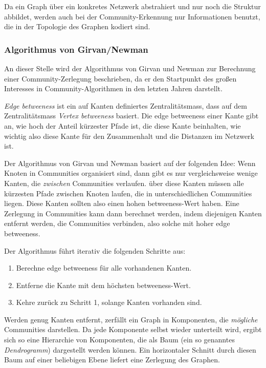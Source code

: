 Da ein Graph über ein konkretes Netzwerk abstrahiert und nur noch
die Struktur abbildet, werden auch bei der Community-Erkennung nur
Informationen benutzt, die in der Topologie des Graphen kodiert sind. 

\subsubsection{Algorithmus von Girvan/Newman}
\label{sec:algor-von-girv-1}

An dieser Stelle wird der Algorithmus von Girvan
und Newman\cite{Newman2004} zur Berechnung einer Community-Zerlegung
beschrieben, da er den Startpunkt des großen Interesses in
Community-Algorithmen in den letzten Jahren darstellt.

\emph{Edge betweeness} ist ein auf Kanten definiertes
Zentralitätsmass, dass auf dem Zentralitätsmass \emph{Vertex
  betweeness}\cite{Koschutzki2004a} basiert. Die edge betweeness
einer Kante gibt an, wie hoch der Anteil kürzester Pfade ist, die
diese Kante beinhalten, wie wichtig also diese Kante für den
Zusammenhalt und die Distanzen im Netzwerk ist.

Der Algorithmus von Girvan und Newman basiert auf der folgenden Idee:
Wenn Knoten in Communities organisiert sind, dann gibt es nur
vergleichsweise wenige Kanten, die \emph{zwischen} Communities
verlaufen. über diese Kanten müssen alle kürzesten Pfade
zwischen Knoten laufen, die in unterschiedlichen Communities
liegen. Diese Kanten sollten also einen hohen betweeness-Wert
haben. Eine Zerlegung in Communities kann dann berechnet werden, indem
diejenigen Kanten entfernt werden, die Communities verbinden, also
solche mit hoher edge betweeness.

Der Algorithmus führt iterativ die folgenden Schritte aus:

\begin{enumerate}
\item Berechne edge betweeness für alle vorhandenen Kanten.
\item Entferne die Kante mit dem höchsten betweeness-Wert.
\item Kehre zurück zu Schritt 1, solange Kanten vorhanden sind.
\end{enumerate}

Werden genug Kanten entfernt, zerfällt ein Graph in Komponenten, die
\emph{mögliche} Communities darstellen. Da jede Komponente selbst
wieder unterteilt wird, ergibt sich so eine Hierarchie von
Komponenten, die als Baum (ein so genanntes \emph{Dendrogramm})
dargestellt werden können. Ein horizontaler Schnitt durch diesen
Baum auf einer beliebigen Ebene liefert eine Zerlegung des Graphen.

